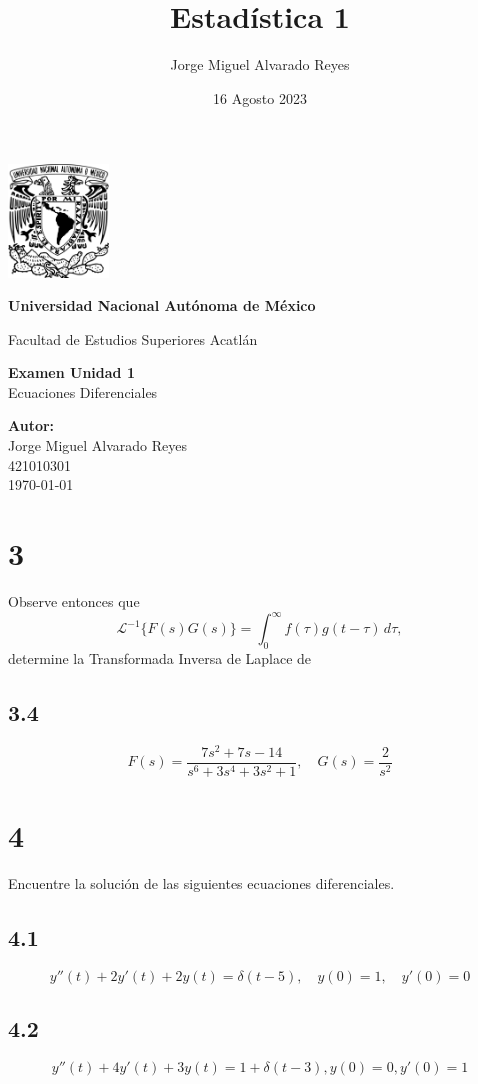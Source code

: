 \documentclass{article}
\title{Estadística 1}
\author{Jorge Miguel Alvarado Reyes}
\date{16 Agosto 2023}
\begin{document}
\begin{titlepage}
    \begin{center}
        \includegraphics[width=0.2\textwidth]{../../unam.png}
        \vspace*{.5cm}

        \LARGE
        \textbf{Universidad Nacional Autónoma de México}

        \vspace{0.5cm}
        \LARGE
        Facultad de Estudios Superiores Acatlán

        \vspace{2cm}

        \textbf{Examen Unidad 1} \\
        Ecuaciones Diferenciales

        \vfill

        \vspace{1cm}

        \textbf{\large Autor:} \\
        Jorge Miguel Alvarado Reyes \\
        421010301\\
        \vspace{.5cm}
        \normalsize \today

    \end{center}
\end{titlepage}
\newpage

\tableofcontents

\newpage

\section{3}
Observe entonces que
\[
\mathcal{L}^{-1}\{F(s)G(s)\} = \int_0^{\infty} f(\tau)g(t - \tau) \, d\tau,
\]
determine la Transformada Inversa de Laplace de


\subsection{3.4}
\[
    F(s) = \frac{7s^2+7s-14}{s^6+3s^4+3s^2+1}, \quad G(s) = \frac{2}{s^2}
\]

\section{4}
Encuentre la solución de las siguientes ecuaciones diferenciales.

\subsection{4.1}

\[
    y''(t) + 2y'(t) + 2y(t) = \delta(t-5), \quad y(0)=1, \quad y'(0)=0
\]
\subsection{4.2}

\[
    y''(t) + 4y'(t) + 3y(t) = 1 + \delta(t-3), y(0)=0, y'(0) = 1
\]
\end{document}
